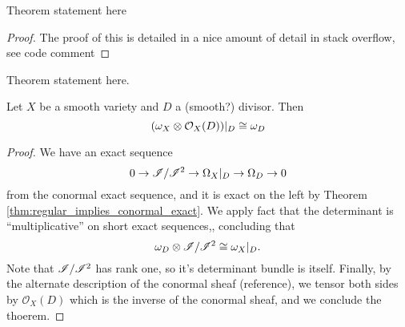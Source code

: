 \begin{corollary}
%

\begin{theorem}
  \label{thm:alt_desc_conormal}
  Theorem statement here
\end{theorem}

\begin{proof}
  The proof of this is detailed in a nice amount of detail in
  stack overflow, see code comment
\end{proof}

%
%


\begin{theorem}
  \label{thm:det_exact_sequence_tensor}
  Theorem statement here.

\end{theorem}




\begin{theorem}
	\label{thm:adjunction_formula}
	Let \(X\) be a smooth variety and \(D\) a
	(smooth?) divisor. 
	Then 
	\[
    (\omega_{X} \otimes \mathcal{O}_X( D))|_{D} 
    \cong \omega_{D}
	\] 
	
\end{theorem}

\begin{proof}
  We have an exact sequence
  \[
    0 \to \mathscr{I} / \mathscr{I}^{2} \to 
    \Omega_X|_D \to \Omega_D \to 0
  \]
  from the conormal exact sequence, and
  it is exact on the left by 
  Theorem \ref{thm:regular_implies_conormal_exact}.
  We apply fact that the determinant is
  ``multiplicative'' on short exact sequences,,
  concluding that 
  \[
     \omega_D \otimes \mathscr{I} / \mathscr{I}^{2} 
     \cong \omega_X|_D
   .\]
   Note that $\mathscr{I} / \mathscr{I}^{2}$ has rank one, so it's 
   determinant bundle is itself.
   Finally,
   by the alternate description of the conormal
   sheaf (reference),
   we tensor both sides by 
   $\mathcal{O}_X(D)$ which is the inverse
   of the conormal sheaf, and we conclude the 
   thoerem.


\end{proof}
\end{corollary}
